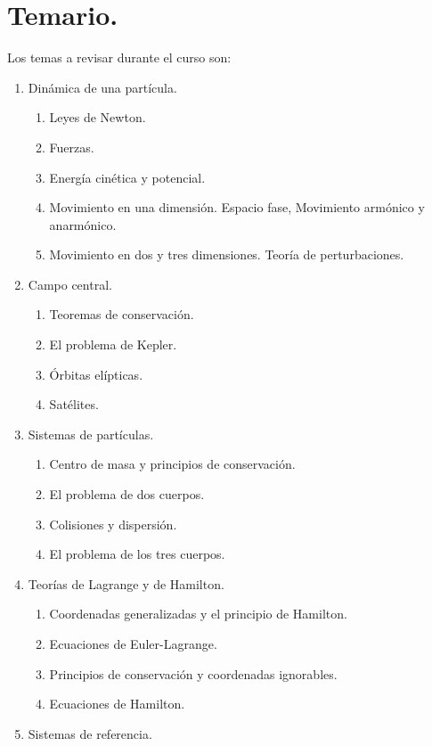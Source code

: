 \documentclass[hidelinks,12pt]{article}
\begin{document}
\newpage

\section{Temario.}

Los temas a revisar durante el curso son:
\begin{enumerate}
\item Dinámica de una partícula.
\begin{enumerate}
    \item Leyes de Newton.
    \item Fuerzas.
    \item Energía cinética y potencial.
    \item Movimiento en una dimensión. Espacio fase, Movimiento armónico y anarmónico.
    \item Movimiento en dos y tres dimensiones. Teoría de perturbaciones.
\end{enumerate}
\item Campo central.
\begin{enumerate}
    \item Teoremas de conservación.
    \item El problema de Kepler.
    \item Órbitas elípticas.
    \item Satélites.
\end{enumerate}
\item Sistemas de partículas.
\begin{enumerate}
    \item Centro de masa y principios de conservación.
    \item El problema de dos cuerpos.
    \item Colisiones y dispersión.
    \item El problema de los tres cuerpos.
\end{enumerate}
\item Teorías de Lagrange y de Hamilton.
\begin{enumerate}
    \item Coordenadas generalizadas y el principio de Hamilton.
    \item Ecuaciones de Euler-Lagrange.
    \item Principios de conservación y coordenadas ignorables.
    \item Ecuaciones de Hamilton.
\end{enumerate}
\item Sistemas de referencia.
\begin{enumerate}

\end{enumerate}
\end{enumerate}
\end{document}
